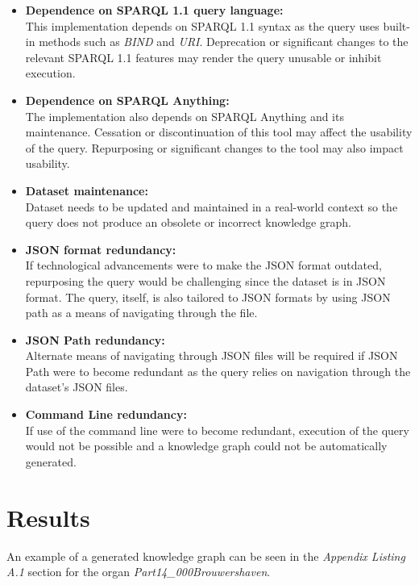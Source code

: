\begin{itemize}
    \item \textbf{Dependence on SPARQL 1.1 query language:} \\ This implementation depends on SPARQL 1.1 syntax as the query uses built-in methods such as \textit{BIND} and \textit{URI}. Deprecation or significant changes to the relevant SPARQL 1.1 features may render the query unusable or inhibit execution.
    \item \textbf{Dependence on SPARQL Anything:} \\ The implementation also depends on SPARQL Anything and its maintenance. Cessation or discontinuation of this tool may affect the usability of the query. Repurposing or significant changes to the tool may also impact usability. 
    \item \textbf{Dataset maintenance:} \\ Dataset needs to be updated and maintained in a real-world context so the query does not produce an obsolete or incorrect knowledge graph. 
    \item \textbf{JSON format redundancy:} \\ If technological advancements were to make the JSON format outdated, repurposing the query would be challenging since the dataset is in JSON format. The query, itself, is also tailored to JSON formats by using JSON path as a means of navigating through the file.
    \item \textbf{JSON Path redundancy:} \\ Alternate means of navigating through JSON files will be required if JSON Path were to become redundant as the query relies on navigation through the dataset's JSON files.
    \item \textbf{Command Line redundancy:} \\ If use of the command line were to become redundant, execution of the query would not be possible and a knowledge graph could not be automatically generated. 
\end{itemize}

\section{Results}
\hspace{0.5cm} An example of a generated knowledge graph can be seen in the \textit{Appendix Listing A.1} section for the organ \textit{Part14\_000Brouwershaven}. 